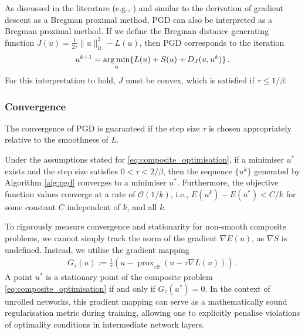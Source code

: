 \begin{rem}\normalfont
As discussed in the literature (e.g., \cite{benning2018modern}) and similar to the derivation of gradient descent as a Bregman proximal method, PGD can also be interpreted as a Bregman proximal method. If we define the Bregman distance generating function $J(u) = \frac{1}{2\tau}\|u\|_\mathcal{U}^2 - L(u)$, then PGD corresponds to the iteration
\begin{align*}
u^{k+1} = \operatorname*{arg\,min}_{u} \{ L(u) + S(u) + D_J(u, u^k) \} \, .
\end{align*}
For this interpretation to hold, $J$ must be convex, which is satisfied if $\tau \leq 1/\beta$.
\end{rem}

\subsubsection{Convergence}
The convergence of PGD is guaranteed if the step size $\tau$ is chosen appropriately relative to the smoothness of $L$.

\begin{thm}\label{thm:pgd_convergence}\normalfont
Under the assumptions stated for \eqref{eq:composite_optimisation}, if a minimiser $u^*$ exists and the step size satisfies $0 < \tau < 2/\beta$, then the sequence $\{u^k\}$ generated by Algorithm \ref{alg:pgd} converges to a minimiser $u^*$. Furthermore, the objective function values converge at a rate of $\mathcal{O}(1/k)$, i.e., $E(u^k) - E(u^\ast) < C / k$ for some constant $C$ independent of $k$, and all $k$.
\end{thm}

To rigorously measure convergence and stationarity for non-smooth composite problems, we cannot simply track the norm of the gradient $\nabla E(u)$, as $\nabla S$ is undefined. Instead, we utilise the gradient mapping
\begin{align*}
G_\tau(u) := \frac{1}{\tau} \left( u - \operatorname{prox}_{\tau S}(u - \tau \nabla L(u)) \right) \, .
\end{align*}
A point $u^*$ is a stationary point of the composite problem \eqref{eq:composite_optimisation} if and only if $G_\tau(u^*) = 0$. In the context of unrolled networks, this gradient mapping can serve as a mathematically sound regularisation metric during training, allowing one to explicitly penalise violations of optimality conditions in intermediate network layers.

